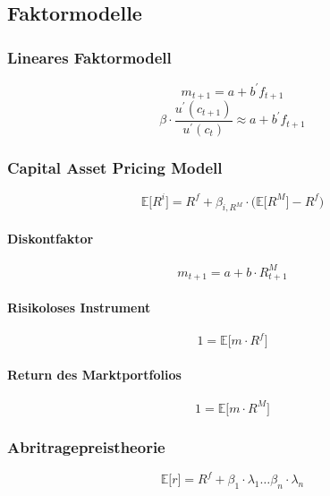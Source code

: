 \subsection{Faktormodelle}

\subsubsection{Lineares Faktormodell}
\begin{equation}
	m_{t+1} = a + b^\prime f_{t+1} \label{eq:lfm}
\end{equation}
\begin{equation}
	\beta \cdot \frac{u^\prime(c_{t+1})}{u^\prime(c_t)} \approx a + b^\prime f_{t+1} \label{eq:lff}
\end{equation}

\subsubsection{Capital Asset Pricing Modell}
\begin{equation}
	\mathbb{E} \big\lbrack R^i \big\rbrack = R^f + \beta_{i,R^M} \cdot \big( \mathbb{E} \big\lbrack R^M \big\rbrack - R^f \big) \label{eq:capm}
\end{equation}
\paragraph{Diskontfaktor}
\begin{equation}
	m_{t+1} = a + b \cdot R^M_{t+1}
\end{equation}
\paragraph{Risikoloses Instrument}
\begin{equation}
	1 = \mathbb{E} \big\lbrack m \cdot R^f \big\rbrack
\end{equation}
\paragraph{Return des Marktportfolios}
\begin{equation}
	1 = \mathbb{E} \big\lbrack m \cdot R^M \big\rbrack
\end{equation}

\subsubsection{Abritragepreistheorie}
\begin{equation}
	\mathbb{E} \big\lbrack r \big\rbrack = R^f + \beta_1 \cdot \lambda_1 \dots \beta_n \cdot \lambda_n \label{eq:apt}
\end{equation}

